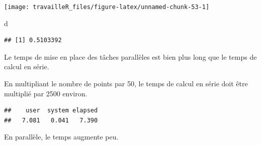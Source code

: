 \documentclass[
  11pt,
  french,
  a4paper,
  extrafontsizes,onecolumn,openright
  ]{memoir}
\newenvironment{Shaded}{\begin{snugshade}}{\end{snugshade}}
\newcommand{\DecValTok}[1]{\textcolor[rgb]{0.00,0.00,0.81}{#1}}
\newcommand{\FunctionTok}[1]{\textcolor[rgb]{0.00,0.00,0.00}{#1}}
\newcommand{\NormalTok}[1]{#1}
\newcommand{\OtherTok}[1]{\textcolor[rgb]{0.56,0.35,0.01}{#1}}
\newcommand{\SpecialCharTok}[1]{\textcolor[rgb]{0.00,0.00,0.00}{#1}}
\begin{document}
\begin{center}\texttt{[image: travailleR\_files/figure-latex/unnamed-chunk-53-1]} \end{center}

\begin{Shaded}
\begin{Highlighting}[]
\NormalTok{d}
\end{Highlighting}
\end{Shaded}

\begin{verbatim}
## [1] 0.5103392
\end{verbatim}

\normalsize

Le temps de mise en place des tâches parallèles est bien plus long que le temps de calcul en série.

En multipliant le nombre de points par 50, le temps de calcul en série doit être multiplié par 2500 environ.

\scriptsize

\begin{Shaded}
\end{Shaded}

\begin{verbatim}
##    user  system elapsed 
##   7.081   0.041   7.390
\end{verbatim}

\normalsize

En parallèle, le temps augmente peu.

\scriptsize

\begin{Shaded}
\end{Shaded}
\end{document}
